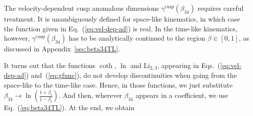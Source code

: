 \documentclass[a4paper,11pt]{article}
\newcommand{\Li}{{\text{Li}}}
\numberwithin{equation}{section}
\begin{document}
The velocity-dependent cusp anomalous dimensions
$\gamma^{\text{cusp}}(\beta_{34})$ requires careful treatment. It is
unambiguously defined for space-like kinematics, in which case the function
given in Eq.~(\ref{eq:vel-dep-ad}) is real.  In the time-like kinematics,
however, $\gamma^{\text{cusp}}(\beta_{34})$ has to be analytically continued to
the region $\beta \in [0,1]$, as discussed in Appendix~\ref{sec:beta34TL}.

It turns out that the functions $\coth$, $\ln$ and $\Li_{2,3}$, appearing in
Eqs.~(\ref{eq:vel-dep-ad}) and~(\ref{eq:gfunc}), do not develop discontinuities
when going from the space-like to the time-like case. 
%
%
Hence, in those functions, we just substitute $\beta_{34} \to \displaystyle
\ln\left(\frac{1+\beta_t}{1-\beta_t}\right)$. And then, wherever $\beta_{34}$
appears in a coefficient, we use Eq.~(\ref{eq:beta34TL}). At the end, we obtain
%
%
\allowdisplaybreaks
\end{document}

